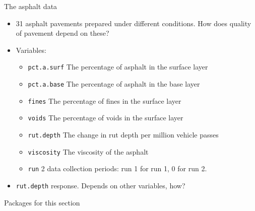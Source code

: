 \begin{frame}[fragile]{The asphalt data}
\protect\hypertarget{the-asphalt-data}{}
\begin{itemize}
\tightlist
\item
  31 asphalt pavements prepared under different conditions. How does
  quality of pavement depend on these?
\item
  Variables:

  \begin{itemize}
  \tightlist
  \item
    \texttt{pct.a.surf} The percentage of asphalt in the surface layer
  \item
    \texttt{pct.a.base} The percentage of asphalt in the base layer
  \item
    \texttt{fines} The percentage of fines in the surface layer
  \item
    \texttt{voids} The percentage of voids in the surface layer
  \item
    \texttt{rut.depth} The change in rut depth per million vehicle
    passes
  \item
    \texttt{viscosity} The viscosity of the asphalt
  \item
    \texttt{run} 2 data collection periods: run 1 for run 1, 0 for run
    2.
  \end{itemize}
\item
  \texttt{rut.depth} response. Depends on other variables, how?
\end{itemize}
\end{frame}

\begin{frame}[fragile]{Packages for this section}
\protect\hypertarget{packages-for-this-section}{}
\begin{Shaded}
\begin{Highlighting}[]
\end{Highlighting}
\end{Shaded}
\end{frame}

